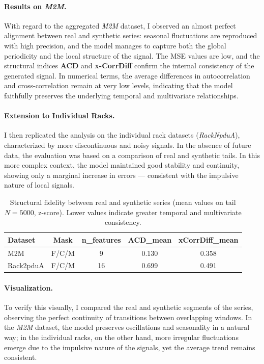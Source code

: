 \paragraph{Results on \emph{M2M}.}
With regard to the aggregated \emph{M2M} dataset, I observed an almost perfect alignment between real and synthetic series: seasonal fluctuations are reproduced with high precision, and the model manages to capture both the global periodicity and the local structure of the signal.  
The MSE values are low, and the structural indices \textbf{ACD} and \textbf{x-CorrDiff} confirm the internal consistency of the generated signal.  
In numerical terms, the average differences in autocorrelation and cross-correlation remain at very low levels, indicating that the model faithfully preserves the underlying temporal and multivariate relationships.

\paragraph{Extension to Individual Racks.}
I then replicated the analysis on the individual rack datasets (\emph{RackNpduA}), characterized by more discontinuous and noisy signals.  
In the absence of future data, the evaluation was based on a comparison of real and synthetic tails.  
In this more complex context, the model maintained good stability and continuity, showing only a marginal increase in errors — consistent with the impulsive nature of local signals.

\begin{table}[H]
\centering
\caption{Structural fidelity between real and synthetic series (mean values on tail $N{=}5000$, z-score). Lower values indicate greater temporal and multivariate consistency.}
\vspace{1mm}
{\small
\begin{tabular}{| l | c | c | c | c |}
\hline
\rowcolor[HTML]{F87C58}
\textbf{Dataset} & \textbf{Mask} & \textbf{n\_features} & \textbf{ACD\_mean} & \textbf{xCorrDiff\_mean} \\
\hline
\rowcolor[HTML]{FDE5DC}
M2M       & F/C/M & 9  & 0.130 & 0.358 \\ \hline
\rowcolor[HTML]{FFF4EE}
Rack2pduA & F/C/M & 16 & 0.699 & 0.491 \\ \hline
\end{tabular}
}
\label{tab:acd_xcorr_summary_1}
\end{table}

\paragraph{Visualization.}
To verify this visually, I compared the real and synthetic segments of the series, observing the perfect continuity of transitions between overlapping windows.  
In the \emph{M2M} dataset, the model preserves oscillations and seasonality in a natural way; in the individual racks, on the other hand, more irregular fluctuations emerge due to the impulsive nature of the signals, yet the average trend remains consistent.

